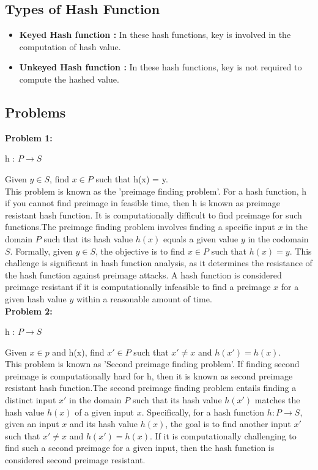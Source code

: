 \documentclass[11pt]{article}
\begin{document}
\subsection{Types of Hash Function}
\begin{itemize}
    \item \textbf{Keyed Hash function : } In these hash functions, key is involved in the computation of hash value.
    \item \textbf{Unkeyed Hash function : } In these hash functions, key is not required to compute the hashed value.
\end{itemize}

\subsection{Problems}
\textbf{Problem 1:}\\
\begin{center}
    h : $ P \rightarrow S$
\end{center}
Given $y \in S$, find $x \in P$ such that h(x) = y. \\
\newline
This problem is known as the 'preimage finding problem'. For a hash function, h if you cannot find preimage in feasible time, then h is known as preimage resistant hash function. It is computationally difficult to find preimage for such functions.The preimage finding problem involves finding a specific input $x$ in the domain $P$ such that its hash value $h(x)$ equals a given value $y$ in the codomain $S$. Formally, given $y \in S$, the objective is to find $x \in P$ such that $h(x) = y$. This challenge is significant in hash function analysis, as it determines the resistance of the hash function against preimage attacks. A hash function is considered preimage resistant if it is computationally infeasible to find a preimage $x$ for a given hash value $y$ within a reasonable amount of time.\\
\newline
\textbf{Problem 2:}\\
\begin{center}
    h : $ P \rightarrow S$
\end{center}
Given $x \in p$ and h(x), find $x' \in P$ such that $x' \neq x$ and $h(x') = h(x)$.\\
\newline
This problem is known as 'Second preimage finding problem'. If finding second preimage is computationally hard for h, then it is known as second preimage resistant hash function.The second preimage finding problem entails finding a distinct input $x'$ in the domain $P$ such that its hash value $h(x')$ matches the hash value $h(x)$ of a given input $x$. Specifically, for a hash function $h : P \rightarrow S$, given an input $x$ and its hash value $h(x)$, the goal is to find another input $x'$ such that $x' \neq x$ and $h(x') = h(x)$. If it is computationally challenging to find such a second preimage for a given input, then the hash function is considered second preimage resistant.\\
\end{document}
